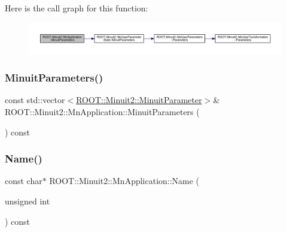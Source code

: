 Here is the call graph for this function\+:\nopagebreak
\begin{figure}[H]
\begin{center}
\leavevmode
\includegraphics[width=350pt]{df/dd5/classROOT_1_1Minuit2_1_1MnApplication_a415948149d0f79b43adccc1cb7040e10_cgraph}
\end{center}
\end{figure}
\mbox{\label{classROOT_1_1Minuit2_1_1MnApplication_a8ae2de0bd82d99a3ac28da32bcbe98ea}} 
\subsubsection{\texorpdfstring{MinuitParameters()}{MinuitParameters()}\hspace{0.1cm}{\footnotesize\ttfamily [2/2]}}
{\footnotesize\ttfamily const std\+::vector$<$\mbox{\hyperlink{classROOT_1_1Minuit2_1_1MinuitParameter}{R\+O\+O\+T\+::\+Minuit2\+::\+Minuit\+Parameter}}$>$\& R\+O\+O\+T\+::\+Minuit2\+::\+Mn\+Application\+::\+Minuit\+Parameters (\begin{DoxyParamCaption}{ }\end{DoxyParamCaption}) const}

\mbox{\label{classROOT_1_1Minuit2_1_1MnApplication_af970f4c896be2d56b2bfb33a8e6e33c9}} 
\subsubsection{\texorpdfstring{Name()}{Name()}\hspace{0.1cm}{\footnotesize\ttfamily [1/2]}}
{\footnotesize\ttfamily const char$\ast$ R\+O\+O\+T\+::\+Minuit2\+::\+Mn\+Application\+::\+Name (\begin{DoxyParamCaption}\item[{unsigned int}]{ }\end{DoxyParamCaption}) const}

